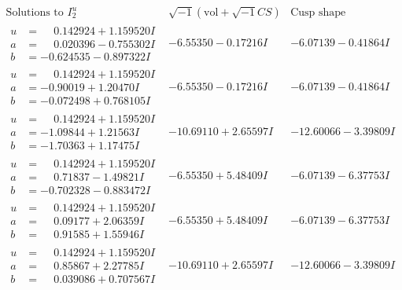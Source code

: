 \documentclass[1p]{elsarticle_modified}
\theoremstyle{definition}
\newcommand{\I}{\sqrt{-1}}
\begin{document}
$$\begin{array}{c|c|c}  
\text{Solutions to }I^u_{2}& \I (\text{vol} + \sqrt{-1}CS) & \text{Cusp shape}\\
 \hline 
\begin{aligned}
u &= \phantom{-}0.142924 + 1.159520 I \\
a &= \phantom{-}0.020396 - 0.755302 I \\
b &= -0.624535 - 0.897322 I\end{aligned}
 & -6.55350 - 0.17216 I & -6.07139 - 0.41864 I \\ \hline\begin{aligned}
u &= \phantom{-}0.142924 + 1.159520 I \\
a &= -0.90019 + 1.20470 I \\
b &= -0.072498 + 0.768105 I\end{aligned}
 & -6.55350 - 0.17216 I & -6.07139 - 0.41864 I \\ \hline\begin{aligned}
u &= \phantom{-}0.142924 + 1.159520 I \\
a &= -1.09844 + 1.21563 I \\
b &= -1.70363 + 1.17475 I\end{aligned}
 & -10.69110 + 2.65597 I & -12.60066 - 3.39809 I \\ \hline\begin{aligned}
u &= \phantom{-}0.142924 + 1.159520 I \\
a &= \phantom{-}0.71837 - 1.49821 I \\
b &= -0.702328 - 0.883472 I\end{aligned}
 & -6.55350 + 5.48409 I & -6.07139 - 6.37753 I \\ \hline\begin{aligned}
u &= \phantom{-}0.142924 + 1.159520 I \\
a &= \phantom{-}0.09177 + 2.06359 I \\
b &= \phantom{-}0.91585 + 1.55946 I\end{aligned}
 & -6.55350 + 5.48409 I & -6.07139 - 6.37753 I \\ \hline\begin{aligned}
u &= \phantom{-}0.142924 + 1.159520 I \\
a &= \phantom{-}0.85867 + 2.27785 I \\
b &= \phantom{-}0.039086 + 0.707567 I\end{aligned}
 & -10.69110 + 2.65597 I & -12.60066 - 3.39809 I \\ \hline\begin{aligned}

\end{aligned}
\end{array}$$
\end{document}
